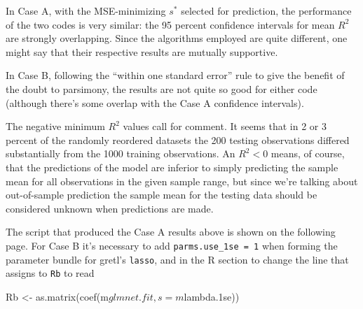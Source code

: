 \documentclass{article}
\begin{document}
In Case A, with the MSE-minimizing $s^*$ selected for prediction, the
performance of the two codes is very similar: the 95 percent
confidence intervals for mean $R^2$ are strongly overlapping.  Since
the algorithms employed are quite different, one might say that their
respective results are mutually supportive.

In Case B, following the ``within one standard error'' rule to give
the benefit of the doubt to parsimony, the results are not quite so
good for either code (although there's some overlap with the Case A
confidence intervals).

The negative minimum $R^2$ values call for comment. It seems that in 2
or 3 percent of the randomly reordered datasets the 200 testing
observations differed substantially from the 1000 training
observations. An $R^2 < 0$ means, of course, that the predictions of
the model are inferior to simply predicting the sample mean for all
observations in the given sample range, but since we're talking about
out-of-sample prediction the sample mean for the testing data should
be considered unknown when predictions are made.

The script that produced the Case A results above is shown on the
following page. For Case B it's necessary to add
\texttt{parms.use\_1se = 1} when forming the parameter bundle for
gretl's \texttt{lasso}, and in the \textsf{R} section to change the
line that assigns to \texttt{Rb} to read
\begin{code}
Rb <- as.matrix(coef(m$glmnet.fit, s = m$lambda.1se))
\end{code}

\clearpage
\end{document}

